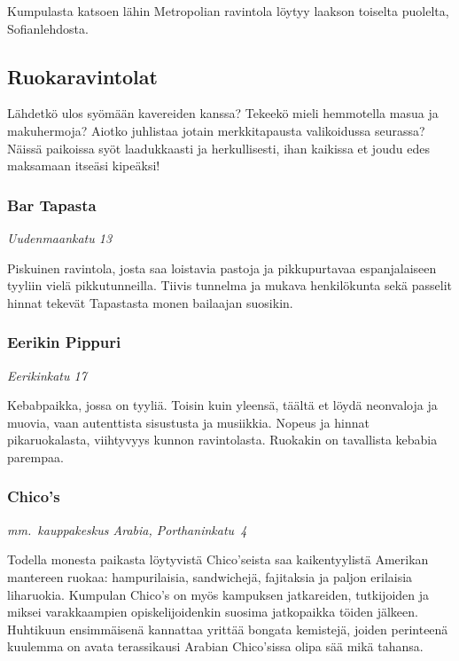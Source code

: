 \documentclass[../ala_hataile.tex]{subfiles}
\begin{document}
Kumpulasta katsoen lähin Metropolian ravintola löytyy laakson toiselta puolelta, Sofianlehdosta.
\subsection*{Ruokaravintolat}
Lähdetkö ulos syömään kavereiden
kanssa?
Tekeekö mieli hemmotella masua
ja makuhermoja? Aiotko juhlistaa jotain
merkkitapausta valikoidussa seurassa?
Näissä paikoissa syöt laadukkaasti ja herkullisesti,
ihan kaikissa et joudu edes maksamaan
itseäsi kipeäksi!
\subsubsection*{Bar Tapasta}
\textit{Uudenmaankatu 13}

Piskuinen ravintola, josta saa loistavia
pastoja ja pikkupurtavaa espanjalaiseen
tyyliin vielä pikkutunneilla. Tiivis tunnelma
ja mukava henkilökunta sekä passelit
hinnat tekevät Tapastasta monen bailaajan
suosikin.
\subsubsection*{Eerikin Pippuri}
\textit{Eerikinkatu 17}

Kebabpaikka, jossa on tyyliä. Toisin
kuin yleensä, täältä et löydä neonvaloja ja
muovia, vaan autenttista sisustusta ja musiikkia.
Nopeus ja hinnat pikaruokalasta,
viihtyvyys kunnon ravintolasta. Ruokakin
on tavallista kebabia parempaa.
\subsubsection*{Chico's}
\textit{mm.~kauppakeskus Arabia, Porthanin\-katu~4}

Todella monesta paikasta löytyvistä
Chico'seista saa kaikentyylistä Amerikan
mantereen ruokaa: hampurilaisia,
sandwichejä,
fajitaksia ja paljon erilaisia liharuokia.
Kumpulan Chico's on myös kampuksen
jatkareiden, tutkijoiden ja miksei
varakkaampien opiskelijoidenkin suosima
jatkopaikka töiden jälkeen. Huhtikuun ensimmäisenä
kannattaa yrittää bongata kemistejä,
joiden perinteenä kuulemma on
avata terassikausi Arabian Chico'sissa olipa
sää mikä tahansa.
\end{document}
